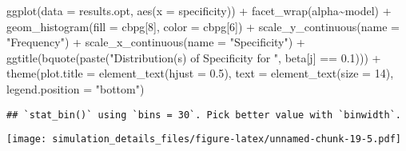 \documentclass[
]{article}
\newenvironment{Shaded}{\begin{snugshade}}{\end{snugshade}}
\newcommand{\AttributeTok}[1]{\textcolor[rgb]{0.77,0.63,0.00}{#1}}
\newcommand{\DecValTok}[1]{\textcolor[rgb]{0.00,0.00,0.81}{#1}}
\newcommand{\FloatTok}[1]{\textcolor[rgb]{0.00,0.00,0.81}{#1}}
\newcommand{\FunctionTok}[1]{\textcolor[rgb]{0.00,0.00,0.00}{#1}}
\newcommand{\NormalTok}[1]{#1}
\newcommand{\SpecialCharTok}[1]{\textcolor[rgb]{0.00,0.00,0.00}{#1}}
\newcommand{\StringTok}[1]{\textcolor[rgb]{0.31,0.60,0.02}{#1}}
\begin{document}
\begin{Shaded}
\begin{Highlighting}[]
\FunctionTok{ggplot}\NormalTok{(}\AttributeTok{data =}\NormalTok{ results.opt,}
       \FunctionTok{aes}\NormalTok{(}\AttributeTok{x =}\NormalTok{ specificity)) }\SpecialCharTok{+}
  \FunctionTok{facet\_wrap}\NormalTok{(alpha}\SpecialCharTok{\textasciitilde{}}\NormalTok{model) }\SpecialCharTok{+}
  \FunctionTok{geom\_histogram}\NormalTok{(}\AttributeTok{fill =}\NormalTok{ cbpg[}\DecValTok{8}\NormalTok{], }\AttributeTok{color =}\NormalTok{ cbpg[}\DecValTok{6}\NormalTok{]) }\SpecialCharTok{+}
  \FunctionTok{scale\_y\_continuous}\NormalTok{(}\AttributeTok{name =} \StringTok{"Frequency"}\NormalTok{) }\SpecialCharTok{+}
  \FunctionTok{scale\_x\_continuous}\NormalTok{(}\AttributeTok{name =} \StringTok{"Specificity"}\NormalTok{) }\SpecialCharTok{+}
  \FunctionTok{ggtitle}\NormalTok{(}\FunctionTok{bquote}\NormalTok{(}\FunctionTok{paste}\NormalTok{(}\StringTok{"Distribution(s) of Specificity for "}\NormalTok{, beta[j] }\SpecialCharTok{==} \FloatTok{0.1}\NormalTok{))) }\SpecialCharTok{+}
  \FunctionTok{theme}\NormalTok{(}\AttributeTok{plot.title =} \FunctionTok{element\_text}\NormalTok{(}\AttributeTok{hjust =} \FloatTok{0.5}\NormalTok{), }
        \AttributeTok{text =} \FunctionTok{element\_text}\NormalTok{(}\AttributeTok{size =} \DecValTok{14}\NormalTok{),}
        \AttributeTok{legend.position =} \StringTok{"bottom"}\NormalTok{)}
\end{Highlighting}
\end{Shaded}

\begin{verbatim}
## `stat_bin()` using `bins = 30`. Pick better value with `binwidth`.
\end{verbatim}

\texttt{[image: simulation\_details\_files/figure-latex/unnamed-chunk-19-5.pdf]}
\end{document}
